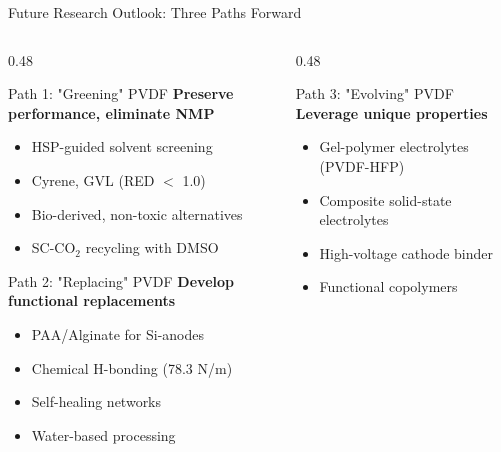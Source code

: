 \documentclass[aspectratio=169]{beamer}
\begin{document}
\begin{frame}{Future Research Outlook: Three Paths Forward}
    \begin{columns}[T]
        \begin{column}{0.48\textwidth}
            \begin{block}{Path 1: "Greening" PVDF}
                \footnotesize \textbf{Preserve performance, eliminate NMP}
                \begin{itemize}\footnotesize
                    \item HSP-guided solvent screening
                    \item Cyrene, GVL (RED $<$ 1.0)
                    \item Bio-derived, non-toxic alternatives
                    \item SC-CO$_2$ recycling with DMSO
                \end{itemize}
            \end{block}
            
            \vspace{0.1cm}
            \begin{block}{Path 2: "Replacing" PVDF}
                \footnotesize \textbf{Develop functional replacements}
                \begin{itemize}\footnotesize
                    \item PAA/Alginate for Si-anodes
                    \item Chemical H-bonding (78.3 N/m)
                    \item Self-healing networks
                    \item Water-based processing
                \end{itemize}
            \end{block}
        \end{column}
        
        \begin{column}{0.48\textwidth}
            \begin{block}{Path 3: "Evolving" PVDF}
                \footnotesize \textbf{Leverage unique properties}
                \begin{itemize}\footnotesize
                    \item Gel-polymer electrolytes (PVDF-HFP)
                    \item Composite solid-state electrolytes
                    \item High-voltage cathode binder
                    \item Functional copolymers
                \end{itemize}
            \end{block}
            

\end{column}
\end{columns}
\end{frame}
\end{document}
